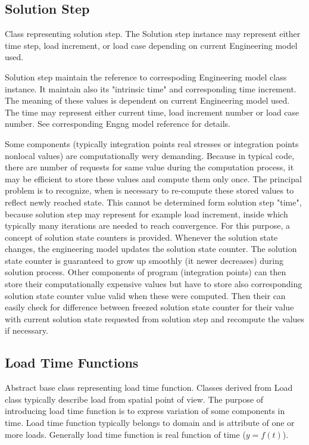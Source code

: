 \documentclass[a4paper]{article}
\begin{document}
\subsection{Solution Step} 
Class representing solution step. The Solution step instance may represent either 
time step, load increment, or load case depending on current Engineering model used.

Solution step maintain the reference to correspoding Engineering model class instance.
It maintain also its "intrinsic time" and corresponding time increment. The meaning of these 
values is dependent on current Engineering model used. The time may represent either
current time, load increment number or load case number. See corresponding 
Engng model reference for details.
	
Some components (typically integration points real stresses or integration points nonlocal values)
are computationally wery demanding. Because in typical code, there are number of requests for same value 
during the computation process, it may be efficient to store these values and compute them only once.
The principal problem is to recognize, when is necessary to re-compute these stored values to reflect 
newly reached state. This cannot be determined form solution step "time", because solution step may 
represent for example load increment, inside which typically many iterations are needed to reach 
convergence. For this purpose, a concept of solution state counters is provided.
Whenever the solution state changes, the engineering model updates the solution state counter.
The solution state counter is guaranteed to grow up smoothly (it newer decreases) during solution process.
Other components of program (integration points) can then store their computationally expensive values
but have to store also corresponding solution state counter value valid when these were computed.
Then their can easily check for difference between freezed solution state counter for their value with 
current solution state requested from solution step and recompute the values if necessary.

\subsection{Load Time Functions}
Abstract base class representing load time function. Classes derived from Load class typically 
describe load from spatial point of view. The purpose of introducing load time function is to express
variation of some components in time. Load time function typically belongs to domain and is 
attribute of one or more loads. Generally load time function is real function of time ($y=f(t)$).
\end{document}
